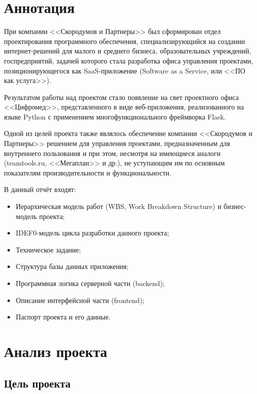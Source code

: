 \documentclass[a4paper, 14pt]{extarticle}
\begin{document}

\newpage


\tableofcontents
\newpage


\section{Аннотация}
При компании <<Скородумов и Партнеры>> был сформирован отдел проектирования программного обеспечения, специализирующийся на создании интернет-решений для малого и среднего бизнеса, образовательных учреждений, госпредприятий, задачей которого стала разработка офиса управления проектами, позиционирующегося как SaaS-приложение (Software as a Service, или <<ПО как услуга>>).

Результатом работы над проектом стало появление на свет проектного офиса <<Цифромед>>, представленного в виде веб-приложения, реализованного на языке Python с применением многофункционального фреймворка Flask.

Одной из целей проекта также являлось обеспечение компании <<Скородумов и Партнеры>> решением для управления проектами, предназначенным для внутреннего пользования и при этом, несмотря на имеющиеся аналоги (teamtools.ru, <<Мегаплан>> и др.), не уступающим им по основным показателям производительности и функциональности.


В данный отчёт входят:

\begin{itemize}
\setlength{\itemsep}{-1mm}
\item Иерархическая модель работ (WBS, Work Breakdown Structure) и бизнес-модель проекта;
\item IDEF0-модель цикла разработки данного проекта;
\item Техническое задание;
\item Структура базы данных приложения;
\item Программная логика серверной части (backend);
\item Описание интерфейсной части (frontend);
\item Паспорт проекта и его данные.
\end{itemize}

\newpage


\section{Анализ проекта}
  \subsection{Цель проекта}
\end{document}
